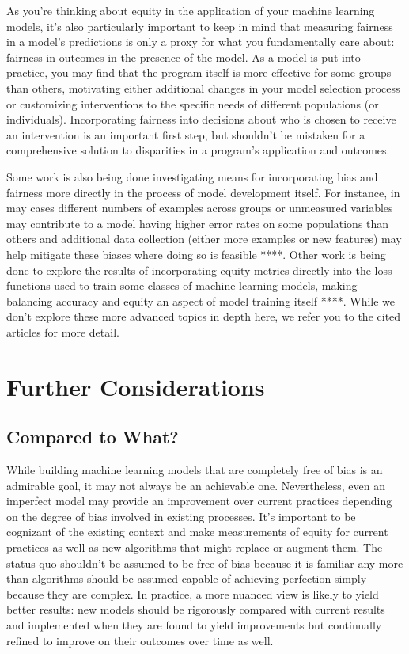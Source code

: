 \documentclass[]{krantz}
\begin{document}
As you're thinking about equity in the application of your machine
learning models, it's also particularly important to keep in mind that
measuring fairness in a model's predictions is only a proxy for what you
fundamentally care about: fairness in outcomes in the presence of the
model. As a model is put into practice, you may find that the program
itself is more effective for some groups than others, motivating either
additional changes in your model selection process or customizing
interventions to the specific needs of different populations (or
individuals). Incorporating fairness into decisions about who is chosen
to receive an intervention is an important first step, but shouldn't be
mistaken for a comprehensive solution to disparities in a program's
application and outcomes.

Some work is also being done investigating means for incorporating bias
and fairness more directly in the process of model development itself.
For instance, in may cases different numbers of examples across groups
or unmeasured variables may contribute to a model having higher error
rates on some populations than others and additional data collection
(either more examples or new features) may help mitigate these biases
where doing so is feasible ****. Other work is being done to explore the
results of incorporating equity metrics directly into the loss functions
used to train some classes of machine learning models, making balancing
accuracy and equity an aspect of model training itself ****. While we
don't explore these more advanced topics in depth here, we refer you to
the cited articles for more detail.

\section{Further Considerations}\label{further-considerations}

\subsection{Compared to What?}\label{compared-to-what}

While building machine learning models that are completely free of bias
is an admirable goal, it may not always be an achievable one.
Nevertheless, even an imperfect model may provide an improvement over
current practices depending on the degree of bias involved in existing
processes. It's important to be cognizant of the existing context and
make measurements of equity for current practices as well as new
algorithms that might replace or augment them. The status quo shouldn't
be assumed to be free of bias because it is familiar any more than
algorithms should be assumed capable of achieving perfection simply
because they are complex. In practice, a more nuanced view is likely to
yield better results: new models should be rigorously compared with
current results and implemented when they are found to yield
improvements but continually refined to improve on their outcomes over
time as well.
\end{document}
